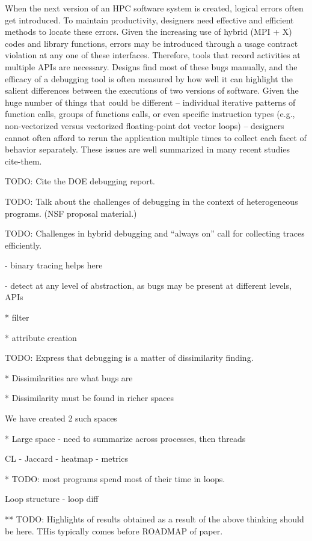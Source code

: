 When the next version of an HPC software system is created, logical errors often
get introduced.
%
To maintain productivity, designers need effective and efficient methods to locate
these errors.
%
Given the increasing use of hybrid (MPI + X) codes and library functions, errors may
be introduced through a usage contract violation at any one of these interfaces.
%
Therefore, tools that record activities at multiple APIs are necessary.
%
Designs find most of these bugs manually, and the efficacy of a debugging tool is
often measured by how well it can highlight the salient differences between the
executions of two versions of software.
%
Given the huge number of things that could be different -- individual iterative
patterns of function calls, groups of functions calls, or even specific instruction
types (e.g., non-vectorized versus vectorized floating-point dot vector loops) -- designers
cannot often afford to rerun the application multiple times to collect each facet
of behavior separately.
%
These issues are well summarized in many recent studies cite-them.

TODO: Cite the DOE debugging report.


TODO: Talk about the challenges of debugging in the context of heterogeneous programs. (NSF proposal material.)

TODO: Challenges in hybrid debugging and ``always on'' call for
collecting traces efficiently.

- binary tracing helps here

- detect at any level of abstraction, as bugs may be present at different levels, APIs

 * filter

 * attribute creation

TODO: Express that debugging is a matter of dissimilarity finding.

  * Dissimilarities are what bugs are

  * Dissimilarity must be found in richer spaces

We have created 2 such spaces

* Large space - need to summarize across processes, then threads

    CL - Jaccard - heatmap - metrics

  * TODO: most programs spend most of their time in loops.

    Loop structure - loop diff

**   TODO: Highlights of results obtained as a result of the above thinking should be here. THis typically
comes before ROADMAP of paper.

